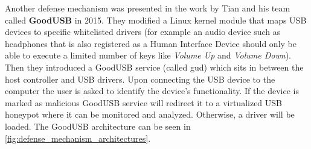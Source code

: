 Another defense mechanism was presented in the work \cite{goodusb} by Tian and his team called \textbf{GoodUSB} in 2015. They modified a Linux kernel module that maps USB devices to specific whitelisted drivers (for example an audio device such as headphones that is also registered as a Human Interface Device should only be able to execute a limited number of keys like \emph{Volume Up} and \emph{Volume Down}). Then they introduced a GoodUSB service (called gud) which sits in between the host controller and USB drivers. Upon connecting the USB device to the computer the user is asked to identify the device's functionality. If the device is marked as malicious GoodUSB service will redirect it to a virtualized USB honeypot where it can be monitored and analyzed. Otherwise, a driver will be loaded. The GoodUSB architecture can be seen in \autoref{fig:defense_mechanism_architectures}.

